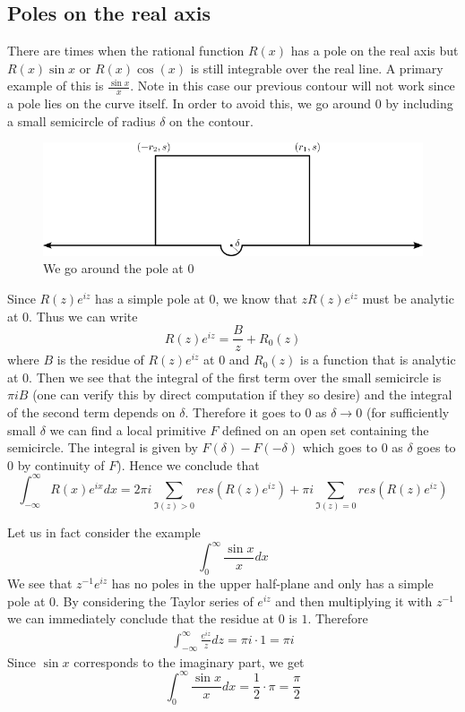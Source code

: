 \subsection{Poles on the real axis}
There are times when the rational function $R(x)$ has a pole on the real axis but $R(x) \sin x$ or $R(x) \cos(x)$ is still integrable over the real line. A primary example of this is $\frac{\sin x}{x}$. Note in this case our previous contour will not work since a pole lies on the curve itself. In order to avoid this, we go around 0 by including a small semicircle of radius $\delta$ on the contour.
\begin{figure}[h]
    \centering
    \includegraphics{Images/real_pole_contour.png}
    \caption{We go around the pole at 0}
    \label{fig:real-pole-contour}
\end{figure}

Since $R(z)e^{iz}$ has a simple pole at $0$, we know that $zR(z) e^{iz}$ must be analytic at 0. Thus we can write
$$R(z) e^{iz} = \frac{B}{z} + R_0(z)$$
where $B$ is the residue of $R(z)e^{iz}$ at 0 and $R_0(z)$ is a function that is analytic at 0. Then we see that the integral of the first term over the small semicircle is $\pi i B$ (one can verify this by direct computation if they so desire) and the integral of the second term depends on $\delta$. Therefore it goes to 0 as $\delta \to 0$ (for sufficiently small $\delta$ we can find a local primitive $F$ defined on an open set containing the semicircle. The integral is given by $F(\delta) - F(-\delta)$ which goes to 0 as $\delta$ goes to 0 by continuity of $F$). Hence we conclude that
$$\int_{-\infty}^{\infty} R(x)e^{ix} dx = 2\pi i \sum_{\Im(z) > 0} res(R(z)e^{iz}) + \pi i \sum_{\Im(z) = 0} res(R(z) e^{iz})$$

Let us in fact consider the example
$$\int_{0}^{\infty} \frac{\sin x}{x} dx$$
We see that $z^{-1} e^{iz}$ has no poles in the upper half-plane and only has a simple pole at 0. By considering the Taylor series of $e^{iz}$ and then multiplying it with $z^{-1}$ we can immediately conclude that the residue at 0 is $1$. Therefore
\begin{align*}
    \int_{-\infty}^{\infty} \frac{e^{iz}}{z} dz = \pi i \cdot 1 = \pi i
\end{align*}
Since $\sin x$ corresponds to the imaginary part, we get 
$$ \int_{0}^{\infty} \frac{\sin x}{x} dx = \frac{1}{2} \cdot \pi  = \frac{\pi}{2} $$

